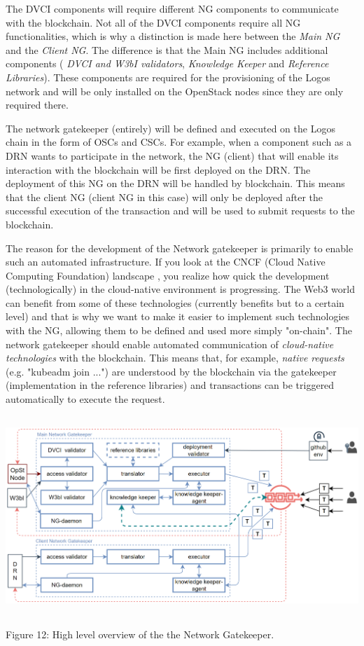 \documentclass[]{article}
\begin{document}
The DVCI components will require different NG components to communicate with the blockchain.   
Not all of the DVCI components require all NG functionalities, which is why a distinction is made here between the \textit{Main NG} and the \textit{Client NG}.
The difference is that the Main NG includes additional components (\textit{ DVCI and W3bI validators}, \textit{Knowledge Keeper} and \textit{Reference Libraries}). 
These components are required for the provisioning of the Logos network and will be only installed on the OpenStack nodes since they are only required there.

The network gatekeeper (entirely) will be defined and executed on the Logos chain in the form of OSCs and CSCs.
For example, when a component such as a DRN wants to participate in the network, the NG (client) that will enable its interaction with the blockchain will be first deployed on the DRN. 
The deployment of this NG on the DRN will be handled by blockchain. 
This means that the client NG (client NG in this case) will only be deployed after the successful execution of the transaction and will be used to submit requests to the blockchain.

The reason for the development of the Network gatekeeper is primarily to enable such an automated infrastructure.
If you look at the CNCF (Cloud Native Computing Foundation) landscape \cite{cncf-land}, you realize how quick the development (technologically) in the cloud-native environment is progressing. 
The Web3 world can benefit from some of these technologies (currently benefits but to a certain level) and that is why we want to make it easier to implement such technologies with the NG, allowing them to be defined and used more simply "on-chain".
The network gatekeeper should enable automated communication of \textit{cloud-native technologies} with the blockchain. 
This means that, for example, \textit{native requests} (e.g. "kubeadm join ...") are understood by the blockchain via the gatekeeper (implementation in the reference libraries) and transactions can be triggered automatically to execute the request.

\begin{center}
	\includegraphics[height=7.5cm]{network-gatekeeper}
\end{center}
\begin{center}
	Figure 12: High level overview of the the Network Gatekeeper.
\end{center}
\end{document}
